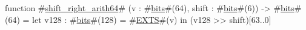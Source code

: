 function #\hyperref[sailRISCVzshiftzyrightzyarith64]{shift\_right\_arith64}# (v : #\hyperref[sailRISCVzbits]{bits}#(64), shift : #\hyperref[sailRISCVzbits]{bits}#(6)) -> #\hyperref[sailRISCVzbits]{bits}#(64) =
    let v128 : #\hyperref[sailRISCVzbits]{bits}#(128) = #\hyperref[sailRISCVzEXTS]{EXTS}#(v) in
    (v128 >> shift)[63..0]
